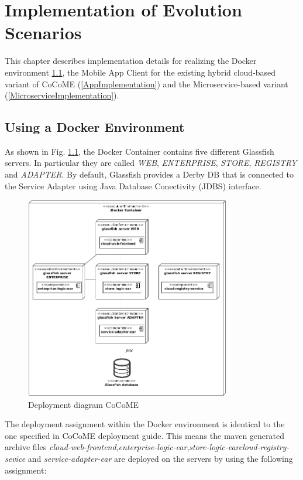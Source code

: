 \chapter{Implementation of Evolution Scenarios}
\label{c:implementation}
This chapter describes implementation details for realizing the Docker environment \ref{DockerImplementation}, the Mobile App Client  for the existing hybrid cloud-based variant of CoCoME (\ref{AppImplementation}) and the Microservice-based variant (\ref{MicroserviceImplementation}).


\section{Using a Docker Environment}\label{DockerImplementation}
 	As shown in Fig. \ref*{Deploym_CoCoME}, the Docker Container contains five different Glassfish servers. In particular they are called \textit{WEB}, \textit{ENTERPRISE}, \textit{STORE}, \textit{REGISTRY} and \textit{ADAPTER}. By default, Glassfish provides a Derby DB that is connected to the Service Adapter using Java Database Conectivity (JDBS) interface.
 	\begin{figure}[h]
 		\centering
 		\includegraphics[width = 0.8\textwidth]{img/docker_Container_Deployment.png}
 		\caption{Deployment diagram CoCoME}
 		\label{Deploym_CoCoME}
 	\end{figure}
 	\noindent
 	The deployment assignment within the Docker environment is identical to the one specified in CoCoME deployment guide.
 	This means the maven generated archive files \textit{cloud-web-frontend},\textit{enterprise-logic-ear},\textit{store-logic-ear}\textit{cloud-registry-sevice} and \textit{service-adapter-ear} are deployed on the servers by using the following assignment:
